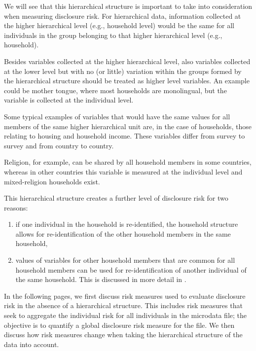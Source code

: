 \documentclass[letterpaper,10pt,english]{sphinxmanual}
\begin{document}
We will see that this hierarchical structure is important to take into
consideration when measuring disclosure risk. For hierarchical data,
information collected at the higher hierarchical level (e.g., household
level) would be the same for all individuals in the group belonging to
that higher hierarchical level (e.g., household). %
\begin{footnote}[3]\sphinxAtStartFootnote
Besides variables collected at the higher hierarchical level, also
variables collected at the lower level but with no (or little)
variation within the groups formed by the hierarchical structure
should be treated as higher level variables. An example could be
mother tongue, where most households are monolingual, but the
variable is collected at the individual level.
%
\end{footnote}
Some typical examples of variables that would have the same values for
all members of the same higher hierarchical unit are, in the case of
households, those relating to housing and household income. These
variables differ from survey to survey and from country to
country. %
\begin{footnote}[4]\sphinxAtStartFootnote
Religion, for example, can be shared by all household members in
some countries, whereas in other countries this variable is measured
at the individual level and mixed-religion households exist.
%
\end{footnote} This hierarchical structure creates a
further level of disclosure risk for two reasons:
\begin{enumerate}
\item {} 
if one individual in the household is re-identified, the household structure allows for
re-identification of the other household members in the same household,

\item {} 
values of variables for other household members that are common for
all household members can be used for re-identification of another
individual of the same household. This is discussed in more detail in
{\hyperref[\detokenize{measure_risk:household-risk}]{}}.

\end{enumerate}

In the following pages, we first discuss risk measures used to evaluate
disclosure risk in the absence of a hierarchical structure. This
includes risk measures that seek to aggregate the individual risk for
all individuals in the microdata file; the objective is to quantify a
global disclosure risk measure for the file. We then discuss how risk
measures change when taking the hierarchical structure of the data into
account.
\end{document}
